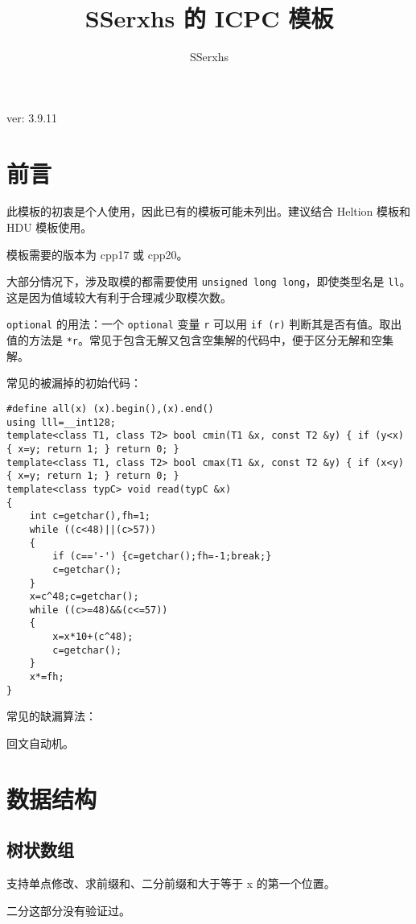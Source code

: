 \documentclass[12pt]{ctexart}
\author{SSerxhs}
\title{SSerxhs 的 ICPC 模板}
\begin{document}
\maketitle

\centerline{ver: 3.9.11}

\tableofcontents

\newpage

\section{前言}

此模板的初衷是个人使用，因此已有的模板可能未列出。建议结合 Heltion 模板和 HDU 模板使用。

模板需要的版本为 cpp17 或 cpp20。

大部分情况下，涉及取模的都需要使用 \verb|unsigned long long|，即使类型名是 \verb|ll|。这是因为值域较大有利于合理减少取模次数。

\verb|optional| 的用法：一个 \verb|optional| 变量 \verb|r| 可以用 \verb|if (r)| 判断其是否有值。取出值的方法是 \verb|*r|。常见于包含无解又包含空集解的代码中，便于区分无解和空集解。

常见的被漏掉的初始代码：
\begin{lstlisting}
#define all(x) (x).begin(),(x).end()
using lll=__int128;
template<class T1, class T2> bool cmin(T1 &x, const T2 &y) { if (y<x) { x=y; return 1; } return 0; }
template<class T1, class T2> bool cmax(T1 &x, const T2 &y) { if (x<y) { x=y; return 1; } return 0; }
template<class typC> void read(typC &x)
{
	int c=getchar(),fh=1;
	while ((c<48)||(c>57))
	{
		if (c=='-') {c=getchar();fh=-1;break;}
		c=getchar();
	}
	x=c^48;c=getchar();
	while ((c>=48)&&(c<=57))
	{
		x=x*10+(c^48);
		c=getchar();
	}
	x*=fh;
}
\end{lstlisting}

常见的缺漏算法：

回文自动机。

\newpage

\section{数据结构}

\subsection{树状数组}

支持单点修改、求前缀和、二分前缀和大于等于 x 的第一个位置。

二分这部分没有验证过。
\end{document}
